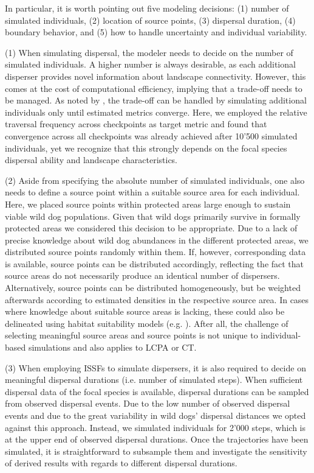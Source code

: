 \documentclass[abstract=on,10pt,a4paper,bibliography=totocnumbered]{article}
\begin{document}
In particular, it is worth pointing out five modeling decisions: (1) number of
simulated individuals, (2) location of source points, (3) dispersal duration,
(4) boundary behavior, and (5) how to handle uncertainty and individual
variability.

(1) When simulating dispersal, the modeler needs to decide on the number of
simulated individuals. A higher number is always desirable, as each additional
disperser provides novel information about landscape connectivity. However, this
comes at the cost of computational efficiency, implying that a trade-off needs
to be managed. As noted by \cite{Signer.2017}, the trade-off can be handled by
simulating additional individuals only until estimated metrics converge. Here,
we employed the relative traversal frequency across checkpoints as target metric
and found that convergence across all checkpoints was already achieved after
10'500 simulated individuals, yet we recognize that this strongly depends on the
focal species dispersal ability and landscape characteristics.

(2) Aside from specifying the absolute number of simulated individuals, one also
needs to define a source point within a suitable source area for each
individual. Here, we placed source points within protected areas large enough to
sustain viable wild dog populations. Given that wild dogs primarily survive in
formally protected areas \citep{Woodroffe.1999, DaviesMostert.2012,
Woodroffe.2012, VanDerMeer.2014} we considered this decision to be appropriate.
Due to a lack of precise knowledge about wild dog abundances in the different
protected areas, we distributed source points randomly within them. If, however,
corresponding data is available, source points can be distributed accordingly,
reflecting the fact that source areas do not necessarily produce an identical
number of dispersers. Alternatively, source points can be distributed
homogeneously, but be weighted afterwards according to estimated densities in
the respective source area. In cases where knowledge about suitable source areas
is lacking, these could also be delineated using habitat suitability models
(e.g. \citealp{Squires.2013}). After all, the challenge of selecting meaningful
source areas and source points is not unique to individual-based simulations and
also applies to LCPA or CT.

(3) When employing ISSFs to simulate dispersers, it is also required to decide
on meaningful dispersal durations (i.e. number of simulated steps). When
sufficient dispersal data of the focal species is available, dispersal durations
can be sampled from observed dispersal events. Due to the low number of observed
dispersal events and due to the great variability in wild dogs' dispersal
distances \citep{DaviesMostert.2012, Masenga.2016, Cozzi.2020} we opted against
this approach. Instead, we simulated individuals for 2'000 steps, which is at
the upper end of observed dispersal durations. Once the trajectories have been
simulated, it is straightforward to subsample them and investigate the
sensitivity of derived results with regards to different dispersal durations.
\end{document}
